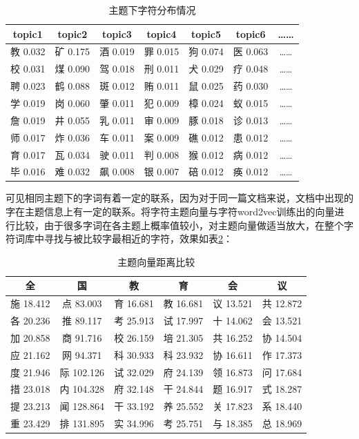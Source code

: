 \documentclass[winfonts,master,oneside,nobackinfo]{njuthesis}
\begin{document}
\begin{table}[h]
\centering
\begin{tabular}{ccccccc} %
\hline 
topic1& topic2& topic3& topic4& topic5& topic6&……\\
\hline  
教 0.032& 矿 0.175& 酒 0.019& 罪 0.015&狗 0.074&医 0.063&……\\
校 0.031& 煤 0.090& 驾 0.018& 刑 0.011&犬 0.029&疗 0.048&……\\
聘 0.023& 鹤 0.088& 斑 0.012& 贿 0.011&鼠 0.025&药 0.030&……\\
学 0.019& 岗 0.060& 肇 0.011& 犯 0.009&樟 0.024&蚁 0.015&……\\
詹 0.019& 井 0.055& 乳 0.011& 审 0.009&豚 0.018&诊 0.013&……\\
师 0.017& 炸 0.036& 车 0.011& 案 0.009&礁 0.012&患 0.012&……\\
育 0.017& 瓦 0.034& 驶 0.011& 判 0.008&猴 0.012&病 0.012&……\\
毕 0.016& 难 0.032& 飙 0.008& 银 0.007&碚 0.012&痪 0.012&……\\
\hline 
\end{tabular}
\caption{主题下字符分布情况}
\label{topic-char}
\end{table}

可见相同主题下的字词有着一定的联系，因为对于同一篇文档来说，文档中出现的字在主题信息上有一定的联系。将字符主题向量与字符word2vec训练出的向量进行比较，由于很多字词在各主题上概率值较小，对主题向量做适当放大，在整个字符词库中寻找与被比较字最相近的字符，效果如表\ref{near-topic}：

\begin{table}[h]
\centering
\begin{tabular}{cccccc} %
\hline 
全& 国& 教& 育& 会& 议\\
\hline  
施 18.412& 点 83.003& 育 16.681& 教 16.681&议 13.521&共 12.872\\
各 20.236& 推 89.117& 考 25.913& 试 17.997&十 14.062&会 13.521\\
加 20.858& 商 91.716& 校 26.159& 培 21.305&共 16.252&协 14.504\\
应 21.162& 网 94.371& 科 30.933& 科 23.932&协 16.611&作 17.373\\
度 21.946& 际 102.126& 试 32.029& 府 24.139&领 16.873&问 17.684\\
措 23.018& 内 104.328& 府 32.148& 干 24.844&题 16.917&式 18.287\\
提 23.213& 闻 128.864& 干 33.192& 养 25.552&关 17.823&系 18.440\\
重 23.429& 排 131.895& 实 34.996& 考 25.751&与 18.385&总 18.969\\
\hline 
\end{tabular}
\caption{主题向量距离比较}
\label{near-topic}
\end{table}
\end{document}

